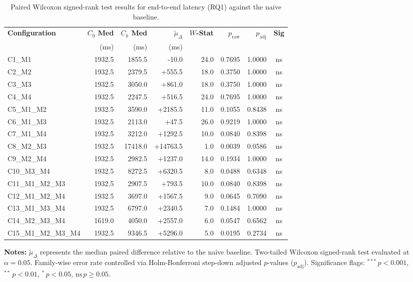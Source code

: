 \begin{table}[!htbp]
\centering
\small
\caption{Paired Wilcoxon signed-rank test results for end-to-end latency (RQ1) against the naive baseline.}
\label{tab:wilcoxon_rq1}
\begin{tabular*}{\textwidth}{@{\extracolsep{\fill}} l r r r r r r c @{}}
\toprule
\textbf{Configuration} & \textbf{$C_0$ Med} & \textbf{$C_k$ Med} & \textbf{$\tilde{\mu}_\Delta$} & \textbf{$W$-Stat} & \textbf{$p_{\text{raw}}$} & \textbf{$p_{\text{adj}}$} & \textbf{Sig} \\
 & \scriptsize{(ms)} & \scriptsize{(ms)} & \scriptsize{(ms)} & & & & \\
\midrule
C1\_M1 & 1932.5 & 1855.5 & -10.0 & 24.0 & 0.7695 & 1.0000 & ns \\
C2\_M2 & 1932.5 & 2379.5 & +555.5 & 18.0 & 0.3750 & 1.0000 & ns \\
C3\_M3 & 1932.5 & 3050.0 & +861.0 & 18.0 & 0.3750 & 1.0000 & ns \\
C4\_M4 & 1932.5 & 2247.5 & +516.5 & 24.0 & 0.7695 & 1.0000 & ns \\
C5\_M1\_M2 & 1932.5 & 3590.0 & +2185.5 & 11.0 & 0.1055 & 0.8438 & ns \\
C6\_M1\_M3 & 1932.5 & 2113.0 & +47.5 & 26.0 & 0.9219 & 1.0000 & ns \\
C7\_M1\_M4 & 1932.5 & 3212.0 & +1292.5 & 10.0 & 0.0840 & 0.8398 & ns \\
C8\_M2\_M3 & 1932.5 & 17418.0 & +14763.5 & 1.0 & 0.0039 & 0.0586 & ns \\
C9\_M2\_M4 & 1932.5 & 2982.5 & +1237.0 & 14.0 & 0.1934 & 1.0000 & ns \\
C10\_M3\_M4 & 1932.5 & 8272.5 & +6320.5 & 8.0 & 0.0488 & 0.6348 & ns \\
C11\_M1\_M2\_M3 & 1932.5 & 2907.5 & +793.5 & 10.0 & 0.0840 & 0.8398 & ns \\
C12\_M1\_M2\_M4 & 1932.5 & 3697.0 & +1567.5 & 9.0 & 0.0645 & 0.7090 & ns \\
C13\_M1\_M3\_M4 & 1932.5 & 6797.0 & +2340.5 & 7.0 & 0.1484 & 1.0000 & ns \\
C14\_M2\_M3\_M4 & 1619.0 & 4050.0 & +2557.0 & 6.0 & 0.0547 & 0.6562 & ns \\
C15\_M1\_M2\_M3\_M4 & 1932.5 & 9346.5 & +5296.0 & 5.0 & 0.0195 & 0.2734 & ns \\
\bottomrule
\end{tabular*}
\vspace{0.5em}
\parbox{\textwidth}{\footnotesize
\textbf{Notes:} $\tilde{\mu}_\Delta$ represents the median paired difference relative to the naive baseline. Two-tailed Wilcoxon signed-rank test evaluated at $\alpha = 0.05$. Family-wise error rate controlled via Holm-Bonferroni step-down adjusted $p$-values ($p_{\text{adj}}$). Significance flags: $^{***}\,p < 0.001$, $^{**}\,p < 0.01$, $^{*}\,p < 0.05$, $\text{ns}\,p \ge 0.05$.}
\end{table}
